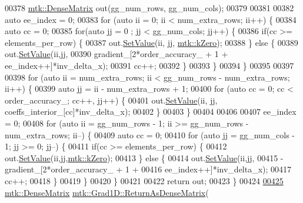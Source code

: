 \begin{DoxyCode}
{{00378   \hyperlink{classmtk_1_1DenseMatrix}{mtk::DenseMatrix} out(gg\_num\_rows, gg\_num\_cols);
00379 
00381 
00382   \textcolor{keyword}{auto} ee\_index = 0;
00383   \textcolor{keywordflow}{for} (\textcolor{keyword}{auto} ii = 0; ii < num\_extra\_rows; ii++) \{
00384     \textcolor{keyword}{auto} cc = 0;
00385     \textcolor{keywordflow}{for}(\textcolor{keyword}{auto} jj = 0 ; jj < gg\_num\_cols; jj++) \{
00386       \textcolor{keywordflow}{if}(cc >= elements\_per\_row) \{
00387         out.\hyperlink{classmtk_1_1DenseMatrix_a784ce5784109ac86bfb9d8562b334b13}{SetValue}(ii, jj, \hyperlink{group__c01-roots_ga59a451a5fae30d59649bcda274fea271}{mtk::kZero});
00388       \} \textcolor{keywordflow}{else} \{
00389         out.\hyperlink{classmtk_1_1DenseMatrix_a784ce5784109ac86bfb9d8562b334b13}{SetValue}(ii,jj,
00390                      gradient\_[2*order\_accuracy\_ + 1 + ee\_index++]*inv\_delta\_x);
00391         cc++;
00392       \}
00393     \}
00394   \}
00395 
00397 
00398   \textcolor{keywordflow}{for} (\textcolor{keyword}{auto} ii = num\_extra\_rows; ii < gg\_num\_rows - num\_extra\_rows; ii++) \{
00399     \textcolor{keyword}{auto} jj = ii - num\_extra\_rows + 1;
00400     \textcolor{keywordflow}{for} (\textcolor{keyword}{auto} cc = 0; cc < order\_accuracy\_; cc++, jj++) \{
00401       out.\hyperlink{classmtk_1_1DenseMatrix_a784ce5784109ac86bfb9d8562b334b13}{SetValue}(ii, jj, coeffs\_interior\_[cc]*inv\_delta\_x);
00402     \}
00403   \}
00404 
00406 
00407   ee\_index = 0;
00408   \textcolor{keywordflow}{for} (\textcolor{keyword}{auto} ii = gg\_num\_rows - 1; ii >= gg\_num\_rows - num\_extra\_rows; ii--) \{
00409     \textcolor{keyword}{auto} cc = 0;
00410     \textcolor{keywordflow}{for} (\textcolor{keyword}{auto} jj = gg\_num\_cols - 1; jj >= 0; jj--) \{
00411       \textcolor{keywordflow}{if}(cc >= elements\_per\_row) \{
00412         out.\hyperlink{classmtk_1_1DenseMatrix_a784ce5784109ac86bfb9d8562b334b13}{SetValue}(ii,jj,\hyperlink{group__c01-roots_ga59a451a5fae30d59649bcda274fea271}{mtk::kZero});
00413       \} \textcolor{keywordflow}{else} \{
00414         out.\hyperlink{classmtk_1_1DenseMatrix_a784ce5784109ac86bfb9d8562b334b13}{SetValue}(ii,jj,
00415                      -gradient\_[2*order\_accuracy\_ + 1 +
00416 ee\_index++]*inv\_delta\_x);
00417         cc++;
00418       \}
00419      \}
00420   \}
00421 
00422   \textcolor{keywordflow}{return} out;
00423 \}
00424 
\hypertarget{mtk__grad__1d_8cc_source_l00425}{}\hyperlink{classmtk_1_1Grad1D_a871a3b31e257b04d5e303b3211df3a73}{00425} \hyperlink{classmtk_1_1DenseMatrix}{mtk::DenseMatrix} \hyperlink{classmtk_1_1Grad1D_a77b2eddbe4ab03f469306c604d505b1a}{mtk::Grad1D::ReturnAsDenseMatrix}(
}}
\end{DoxyCode}
